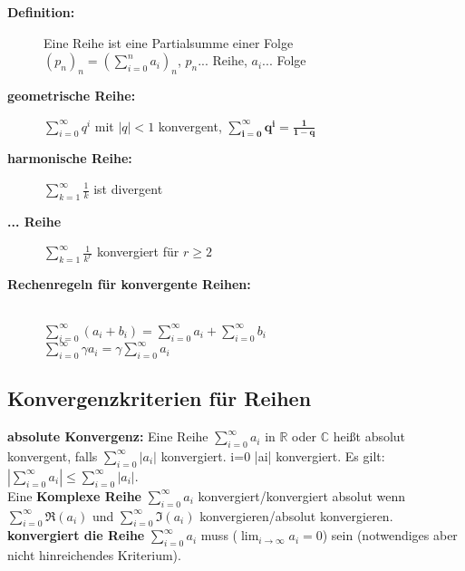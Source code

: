 \begin{description}
    \item[\textbf{Definition:}] Eine Reihe ist eine Partialsumme einer Folge\\
    $(p_n)_n = \left(\sum\limits_{i=0}^{n}a_i \right)_n$, $p_n$... Reihe, $a_i$... Folge\\

    \item [\textbf{geometrische Reihe:}] $\sum\limits_{i=0}^{\infty} q^i$ mit $|q|<1$ konvergent, $\bm{\sum\limits_{i=0}^{\infty} q^i = \frac{1}{1-q}}$
    \item[\textbf{harmonische Reihe:}] $\sum\limits_{k=1}^{\infty}\frac{1}{k}$ ist divergent\\
    \item[\textbf{... Reihe}] $\sum\limits_{k=1}^{\infty}\frac{1}{k^r}$ konvergiert für $r\geq 2$\\
    \item[\textbf{Rechenregeln für konvergente Reihen:}]\ \\
    $\sum\limits_{i=0}^{\infty}(a_i+b_i) = \sum\limits_{i=0}^{\infty}a_i + \sum\limits_{i=0}^{\infty} b_i$\\

    $\sum\limits_{i=0}^{\infty}\gamma a_i = \gamma \sum\limits_{i=0}^{\infty} a_i$\\          
\end{description}



\subsection{Konvergenzkriterien für Reihen}

\textbf{absolute Konvergenz:} Eine Reihe $\sum_{i=0}^{\infty}a_i$ in $\mathbb{R}$ oder $\mathbb{C}$ heißt absolut konvergent, falls $\sum_{i=0}^{\infty}|a_i|$ konvergiert.
i=0 |ai| konvergiert. Es gilt:$|\sum_{i=0}^{\infty}a_i| \leq \sum_{i=0}^{\infty}|a_i|$.\\

Eine \textbf{Komplexe Reihe} $\sum_{i=0}^{\infty}a_i$ konvergiert/konvergiert absolut wenn $\sum_{i=0}^{\infty}\Re(a_i)$ und $\sum_{i=0}^{\infty}\Im(a_i)$ konvergieren/absolut konvergieren.\\

\textbf{konvergiert die Reihe} $\sum_{i=0}^{\infty}a_i$ muss ($\lim_{i\to\infty}a_i = 0$) sein (notwendiges aber nicht hinreichendes Kriterium).\\

